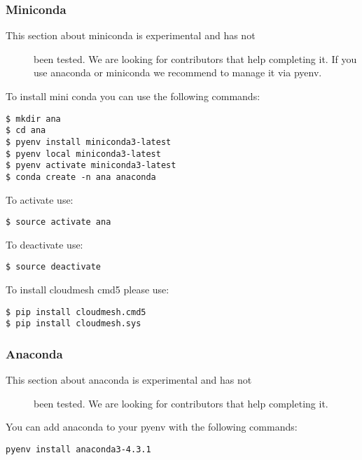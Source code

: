 \subsubsection{Miniconda}\label{miniconda}

\begin{description}
\item[This section about miniconda is experimental and has not]
been tested. We are looking for contributors that help completing it. If
you use anaconda or miniconda we recommend to manage it via pyenv.
\end{description}

To install mini conda you can use the following commands:

\begin{verbatim}
$ mkdir ana
$ cd ana
$ pyenv install miniconda3-latest
$ pyenv local miniconda3-latest
$ pyenv activate miniconda3-latest
$ conda create -n ana anaconda
\end{verbatim}

To activate use:

\begin{verbatim}
$ source activate ana
\end{verbatim}

To deactivate use:

\begin{verbatim}
$ source deactivate
\end{verbatim}

To install cloudmesh cmd5 please use:

\begin{verbatim}
$ pip install cloudmesh.cmd5
$ pip install cloudmesh.sys
\end{verbatim}

\subsubsection{Anaconda}\label{anaconda}

\begin{description}
\item[This section about anaconda is experimental and has not]
been tested. We are looking for contributors that help completing it.
\end{description}

You can add anaconda to your pyenv with the following commands:

\begin{verbatim}
pyenv install anaconda3-4.3.1
\end{verbatim}

